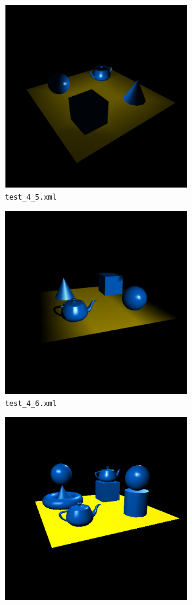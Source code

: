 \documentclass[11pt,a4paper]{report}
\begin{document}
\begin{figure}[H]
\centering
\begin{subfigure}{0.5\textwidth}
  \centering
  \includegraphics[width = 8cm,height = 8cm]{test_4_5.png}
  \caption{\texttt{test\_4\_5.xml}}
  \label{fig:test_4_5}
\end{subfigure}%
\begin{subfigure}{0.5\textwidth}
  \centering
  \includegraphics[width = 8cm,height = 8cm]{test_4_6.png}
  \caption{\texttt{test\_4\_6.xml}}
  \label{fig:test_4_6}
\end{subfigure}
\begin{subfigure}{0.5\textwidth}
  \centering
  \includegraphics[width = 8cm,height = 8cm]{test_light.png}

\end{subfigure}
\end{figure}
\end{document}
